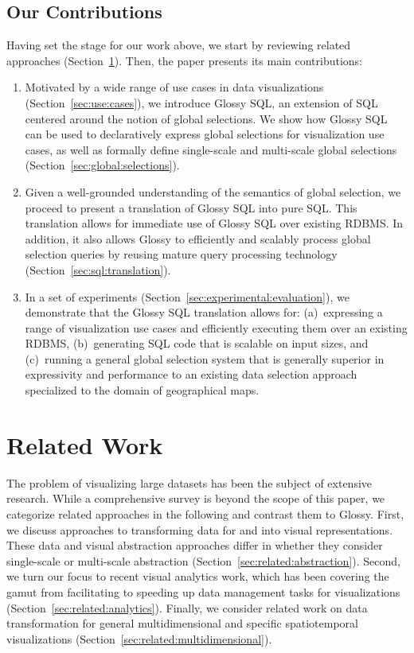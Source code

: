 \documentclass[11pt, oneside]{report}
\begin{document}
{\subsection{Our Contributions}

Having set the stage for our work above, we start by reviewing related approaches (Section~\ref{sec:glossy:related:work}). Then, the paper presents its main contributions:

\begin{enumerate}

\item Motivated by a wide range of use cases in data visualizations (Section~\ref{sec:use:cases}), we introduce Glossy SQL, an extension of SQL centered around the notion of global selections. We show how Glossy SQL can be used to declaratively express global selections for visualization use cases, as well as formally define single-scale and multi-scale global selections (Section~\ref{sec:global:selections}).  

\item Given a well-grounded understanding of the semantics of global selection, we proceed to present a translation of Glossy SQL into pure SQL. This translation allows for immediate use of Glossy SQL over existing RDBMS. In addition, it also allows Glossy to efficiently and scalably process global selection queries by reusing mature query processing technology (Section~\ref{sec:sql:translation}). 

\item In a set of experiments (Section~\ref{sec:experimental:evaluation}), we demonstrate that the Glossy SQL translation allows for: (a)~expressing a range of visualization use cases and efficiently executing them over an existing RDBMS, (b)~generating SQL code that is scalable on input sizes, and (c)~running a general global selection system that is generally superior in expressivity and performance to an existing data selection approach specialized to the domain of geographical maps. 

\end{enumerate} 

\section{Related Work}
\label{sec:glossy:related:work}

The problem of visualizing large datasets has been the subject of extensive research. While a comprehensive survey is beyond the scope of this paper, we categorize related approaches in the following and contrast them to Glossy. First, we discuss approaches to transforming data for and into visual representations. These data and visual abstraction approaches differ in whether they consider single-scale or multi-scale abstraction (Section~\ref{sec:related:abstraction}). Second, we turn our focus to recent visual analytics work, which has been covering the gamut from facilitating to speeding up data management tasks for visualizations (Section~\ref{sec:related:analytics}). Finally, we consider related work on data transformation for general multidimensional and specific spatiotemporal visualizations (Section~\ref{sec:related:multidimensional}). 

}
\end{document}
